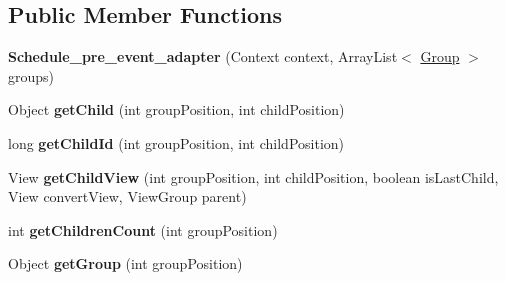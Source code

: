 \subsection*{Public Member Functions}
\begin{DoxyCompactItemize}
\item 
\hypertarget{classantardhvani_1_1du_1_1ac_1_1in_1_1_adapter_1_1_schedule__pre__event__adapter_a1b5ef5121eb003b5d48b35ed768b2244}{}{\bfseries Schedule\+\_\+pre\+\_\+event\+\_\+adapter} (Context context, Array\+List$<$ \hyperlink{classantardhvani_1_1du_1_1ac_1_1in_1_1_adapter_1_1_group}{Group} $>$ groups)\label{classantardhvani_1_1du_1_1ac_1_1in_1_1_adapter_1_1_schedule__pre__event__adapter_a1b5ef5121eb003b5d48b35ed768b2244}

\item 
\hypertarget{classantardhvani_1_1du_1_1ac_1_1in_1_1_adapter_1_1_schedule__pre__event__adapter_a86a2d643f421a9bb4be7b3ee30916de2}{}Object {\bfseries get\+Child} (int group\+Position, int child\+Position)\label{classantardhvani_1_1du_1_1ac_1_1in_1_1_adapter_1_1_schedule__pre__event__adapter_a86a2d643f421a9bb4be7b3ee30916de2}

\item 
\hypertarget{classantardhvani_1_1du_1_1ac_1_1in_1_1_adapter_1_1_schedule__pre__event__adapter_a535a19a991f72085f21829ceaf0f3c39}{}long {\bfseries get\+Child\+Id} (int group\+Position, int child\+Position)\label{classantardhvani_1_1du_1_1ac_1_1in_1_1_adapter_1_1_schedule__pre__event__adapter_a535a19a991f72085f21829ceaf0f3c39}

\item 
\hypertarget{classantardhvani_1_1du_1_1ac_1_1in_1_1_adapter_1_1_schedule__pre__event__adapter_abc72903fbbb266c3d90f7f09e583eac8}{}View {\bfseries get\+Child\+View} (int group\+Position, int child\+Position, boolean is\+Last\+Child, View convert\+View, View\+Group parent)\label{classantardhvani_1_1du_1_1ac_1_1in_1_1_adapter_1_1_schedule__pre__event__adapter_abc72903fbbb266c3d90f7f09e583eac8}

\item 
\hypertarget{classantardhvani_1_1du_1_1ac_1_1in_1_1_adapter_1_1_schedule__pre__event__adapter_a9f2db6b2a8fbd3b02a3bf6c3c6c94e4b}{}int {\bfseries get\+Children\+Count} (int group\+Position)\label{classantardhvani_1_1du_1_1ac_1_1in_1_1_adapter_1_1_schedule__pre__event__adapter_a9f2db6b2a8fbd3b02a3bf6c3c6c94e4b}

\item 
\hypertarget{classantardhvani_1_1du_1_1ac_1_1in_1_1_adapter_1_1_schedule__pre__event__adapter_a832e3acdc9388c58ef9e07e628ca5eff}{}Object {\bfseries get\+Group} (int group\+Position)\label{classantardhvani_1_1du_1_1ac_1_1in_1_1_adapter_1_1_schedule__pre__event__adapter_a832e3acdc9388c58ef9e07e628ca5eff}


\end{DoxyCompactItemize}
